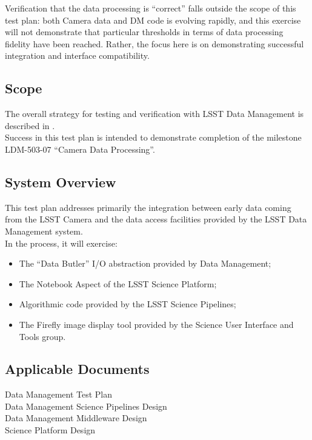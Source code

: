 \documentclass[DM,STR,toc]{lsstdoc}
\providecommand{\tightlist}{
  \setlength{\itemsep}{0pt}\setlength{\parskip}{0pt}}
\begin{document}
Verification that the data processing is ``correct'' falls outside the
scope of this test plan: both Camera data and DM code is evolving
rapidly, and this exercise will not demonstrate that particular
thresholds in terms of data processing fidelity have been reached.
Rather, the focus here is on demonstrating successful integration and
interface compatibility.\\[2\baselineskip]

\subsection{Scope}\label{scope}

The overall strategy for testing and verification with LSST Data
Management is described in .\\
Success in this test plan is intended to demonstrate completion of the
milestone LDM-503-07 ``Camera Data Processing''.



\subsection{System Overview}
\label{sect:systemoverview}

This test plan addresses primarily the integration between early data
coming from the LSST Camera and the data access facilities provided by
the LSST Data Management system.\\[2\baselineskip]In the process, it
will exercise:

\begin{itemize}
\tightlist
\item
  The ``Data Butler'' I/O abstraction provided by Data Management;
\item
  The Notebook Aspect of the LSST Science Platform;
\item
  Algorithmic code provided by the LSST Science Pipelines;
\item
  The Firefly image display tool provided by the Science User Interface
  and Tools group.
\end{itemize}

\subsection{Applicable Documents}\label{applicable-documents}

 Data Management Test Plan\\
 Data Management Science Pipelines Design\\
 Data Management Middleware Design\\
 Science Platform Design
\end{document}
